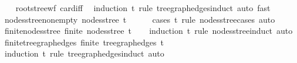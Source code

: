 \begin{isabellebody}
%
\isadelimproof
\ \ %
\endisadelimproof
%
\isatagproof
{}\isamarkupfalse%
\ root{\isacharunderscore}{\kern0pt}stree{\isacharunderscore}{\kern0pt}wf\ card{\isacharunderscore}{\kern0pt}{}{\isacharunderscore}{\kern0pt}iff\ \isamarkupfalse%
\ {\isacharparenleft}{\kern0pt}induction\ t\ rule{\isacharcolon}{\kern0pt}\ tree{\isacharunderscore}{\kern0pt}graph{\isacharunderscore}{\kern0pt}edges{\isachardot}{\kern0pt}induct{\isacharparenright}{\kern0pt}\ {\isacharparenleft}{\kern0pt}auto{\isacharcomma}{\kern0pt}\ fast{\isacharplus}{\kern0pt}{\isacharparenright}{\kern0pt}%
\endisatagproof
{\isafoldproof}%
%
\isadelimproof
\isanewline
%
\endisadelimproof
\isanewline
{}\isamarkupfalse%
\ nodes{\isacharunderscore}{\kern0pt}stree{\isacharunderscore}{\kern0pt}non{\isacharunderscore}{\kern0pt}empty{\isacharcolon}{\kern0pt}\ {\isachardoublequoteopen}nodes{\isacharunderscore}{\kern0pt}stree\ t\ {\isasymnoteq}\ {\isacharbraceleft}{\kern0pt}{\isacharbraceright}{\kern0pt}{\isachardoublequoteclose}\isanewline
%
\isadelimproof
\ \ %
\endisadelimproof
%
\isatagproof
{}\isamarkupfalse%
\ {\isacharparenleft}{\kern0pt}cases\ t\ rule{\isacharcolon}{\kern0pt}\ nodes{\isacharunderscore}{\kern0pt}stree{\isachardot}{\kern0pt}cases{\isacharparenright}{\kern0pt}\ auto%
\endisatagproof
{\isafoldproof}%
%
\isadelimproof
\isanewline
%
\endisadelimproof
\isanewline
{}\isamarkupfalse%
\ finite{\isacharunderscore}{\kern0pt}nodes{\isacharunderscore}{\kern0pt}stree{\isacharcolon}{\kern0pt}\ {\isachardoublequoteopen}finite\ {\isacharparenleft}{\kern0pt}nodes{\isacharunderscore}{\kern0pt}stree\ t{\isacharparenright}{\kern0pt}{\isachardoublequoteclose}\isanewline
%
\isadelimproof
\ \ %
\endisadelimproof
%
\isatagproof
{}\isamarkupfalse%
\ {\isacharparenleft}{\kern0pt}induction\ t\ rule{\isacharcolon}{\kern0pt}\ nodes{\isacharunderscore}{\kern0pt}stree{\isachardot}{\kern0pt}induct{\isacharparenright}{\kern0pt}\ auto%
\endisatagproof
{\isafoldproof}%
%
\isadelimproof
\isanewline
%
\endisadelimproof
\isanewline
{}\isamarkupfalse%
\ finite{\isacharunderscore}{\kern0pt}tree{\isacharunderscore}{\kern0pt}graph{\isacharunderscore}{\kern0pt}edges{\isacharcolon}{\kern0pt}\ {\isachardoublequoteopen}finite\ {\isacharparenleft}{\kern0pt}tree{\isacharunderscore}{\kern0pt}graph{\isacharunderscore}{\kern0pt}edges\ t{\isacharparenright}{\kern0pt}{\isachardoublequoteclose}\isanewline
%
\isadelimproof
\ \ %
\endisadelimproof
%
\isatagproof
{}\isamarkupfalse%
\ {\isacharparenleft}{\kern0pt}induction\ t\ rule{\isacharcolon}{\kern0pt}\ tree{\isacharunderscore}{\kern0pt}graph{\isacharunderscore}{\kern0pt}edges{\isachardot}{\kern0pt}induct{\isacharparenright}{\kern0pt}\ auto%

\end{isabellebody}
